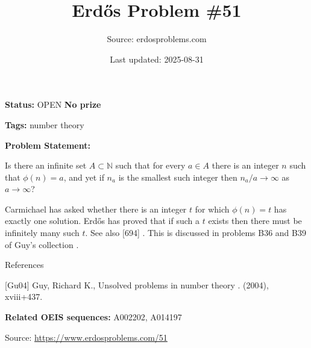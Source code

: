 \documentclass{article}
\title{Erd\H{o}s Problem \#51}
\date{Last updated: 2025-08-31}
\author{Source: erdosproblems.com}
\begin{document}
\maketitle

\noindent\textbf{Status:} OPEN \quad \textbf{No prize}

\noindent\textbf{Tags:} number theory

\medskip

\noindent\textbf{Problem Statement:}

Is there an infinite set $A\subset \mathbb{N}$ such that for every $a\in A$ there is an integer $n$ such that $\phi(n)=a$, and yet if $n_a$ is the smallest such integer then $n_a/a\to \infty$ as $a\to\infty$?




Carmichael has asked whether there is an integer $t$ for which $\phi(n)=t$ has exactly one solution. Erd\H{o}s has proved that if such a $t$ exists then there must be infinitely many such $t$. See also [694] . This is discussed in problems B36 and B39 of Guy's collection \cite{Gu04}.




References

[Gu04] Guy, Richard K., Unsolved problems in number theory . (2004), xviii+437.

\noindent\textbf{Related OEIS sequences:} A002202, A014197


\bigskip
\noindent\small{Source: \url{https://www.erdosproblems.com/51}}
\end{document}
